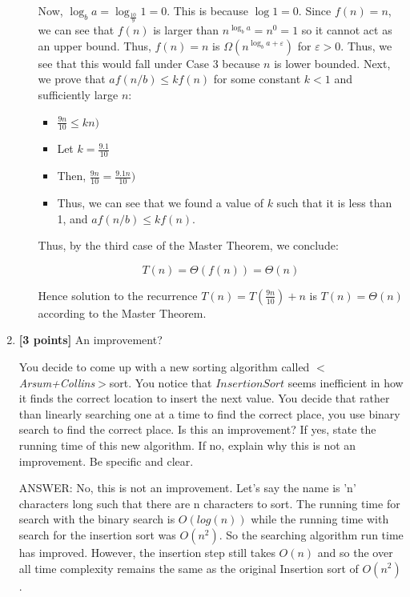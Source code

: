 \documentclass[11pt]{article}
\begin{document}
\begin{enumerate}
\begin{enumerate}
Now, \( \log_b a = \log_{\frac{10}{9}} 1 = 0 \). This is because $\log 1 = 0$. Since \( f(n) = n \), we can see that \( f(n) \) is larger than \( n^{\log_b a} = n^0 = 1 \) so it cannot act as an upper bound. Thus, \( f(n) = n \) is \( \Omega(n^{\log_b a + \varepsilon}) \) for \( \varepsilon > 0 \). Thus, we see that this would fall under Case 3 because \( n \) is lower bounded. Next, we prove that \( a f(n/b) \leq k f(n) \) for some constant \( k < 1 \) and sufficiently large \( n \):
\begin{itemize}
    \item $\frac{9n}{10} \leq kn)$
    \item Let $ k = \frac{9.1}{10}$
    \item Then, $\frac{9n}{10} = \frac{9.1n}{10})$
    \item Thus, we can see that we found a value of \( k \) such that it is less than 1, and \( a f(n/b) \leq k f(n) \).
\end{itemize}

Thus, by the third case of the Master Theorem, we conclude:

\[ T(n) = \Theta(f(n)) = \Theta(n) \]

Hence solution to the recurrence \( T(n) = T\left(\frac{9n}{10}\right) + n \) is \( T(n) = \Theta(n) \) according to the Master Theorem.

\end{enumerate}

\vspace*{.2cm}

\item \textbf{[3 points]} An improvement?

You decide to come up with a new sorting algorithm called \emph{$<$Arsum+Collins$>$}sort.  You notice that $InsertionSort$ seems inefficient in how it finds the correct location to insert the next value.  You decide that rather than linearly searching one at a time to find the correct place, you use binary search to find the correct place.  Is this an improvement?  If yes, state the running time of this new algorithm.  If no, explain why this is not an improvement.  Be specific and clear.

ANSWER: No, this is not an improvement. Let's say the name is 'n' characters long such that there are n characters to sort. The running time for search with the binary search is $O(log(n))$ while the running time with search for the insertion sort was $O(n^2)$. So the searching algorithm run time has improved. However, the insertion step still takes $O(n)$ and so the over all time complexity remains the same as the original Insertion sort of $O(n^2)$.


\end{enumerate}
\end{document}
